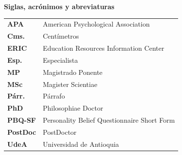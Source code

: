 \newpage
\pagestyle{empty}
    \tableofcontents 
    
    
    
\newpage
    \thispagestyle{empty}
     
    \renewcommand{\listtablename}{Lista de tablas}
    \listoftables
    
    
    
    
\newpage
    \thispagestyle{empty}
    
    \renewcommand{\listfigurename}{Lista de figuras}
    \listoffigures 
    
    
    
    
\newpage
    \thispagestyle{empty}
    
\begin{center}
    \textbf{Siglas, acrónimos y abreviaturas}    
\end{center}

\begin{tabular}{m{2cm}p{10cm}}
    \textbf{APA}		&	American Psychological Association\\
    \textbf{Cms.}	    &	Centímetros\\
    \textbf{ERIC}	    &	Education Resources Information Center\\
    \textbf{Esp.}	    &	Especialista\\
    \textbf{MP}		    &	Magistrado Ponente\\
    \textbf{MSc}		&	Magister Scientiae\\
    \textbf{Párr.}	    &	Párrafo\\
    \textbf{PhD}		&	Philosophiae Doctor\\
    \textbf{PBQ-SF} 	&	Personality Belief Questionnaire Short Form\\
    \textbf{PostDoc}	&	PostDoctor\\
    \textbf{UdeA}	    &	Universidad de Antioquia
\end{tabular}



